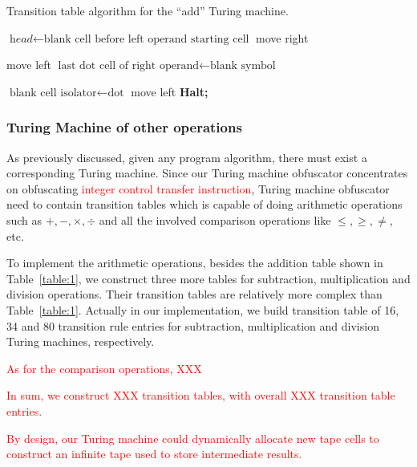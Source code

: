\documentclass[lnicst]{svmultln}
\begin{document}
\begin{algorithm}
\caption{Transition table algorithm for the ``add'' Turing machine.}
\label{adding}
\begin{algorithmic}[1]
\State $\textit{head} \gets \text{blank cell before left operand starting cell}$
 move right\;
\EndWhile

\State move left
\State $\text{last dot cell of right operand} \gets \text{blank symbol}$

\EndWhile
\State $\text{blank cell isolator} \gets \text{dot}$
  move left\;
\EndWhile
\State \textbf{Halt;}
\EndProcedure
\end{algorithmic}
\end{algorithm}

\subsubsection{Turing Machine of other operations}
As previously discussed, given any program algorithm, there must exist a
corresponding Turing machine. Since our Turing machine obfuscator concentrates
on obfuscating \textcolor{red}{integer control transfer instruction}, Turing
machine obfuscator need to contain transition tables which is capable of doing
arithmetic operations such as \(+, -, \times, \div\) and all the involved
comparison operations like \(\leq, \geq, \neq\), etc.

To implement the arithmetic operations, besides the addition table shown in
Table~\ref{table:1}, we construct three more tables for subtraction,
multiplication and division operations. Their transition tables are relatively
more complex than Table~\ref{table:1}. Actually in our implementation, we build
transition table of 16, 34 and 80 transition rule entries for subtraction,
multiplication and division Turing machines, respectively.

\textcolor{red}{As for the comparison operations, XXX}

\textcolor{red}{In sum, we construct XXX transition tables, with overall XXX
  transition table entries.}

\textcolor{red}{By design, our Turing machine could dynamically allocate new
  tape cells to construct an infinite tape used to store intermediate results.}
\end{document}
